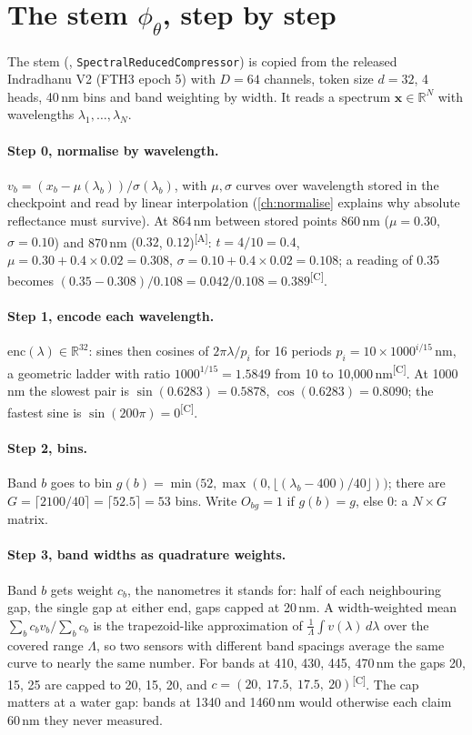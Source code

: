 \documentclass[11pt,a4paper,oneside,openany]{book}
\newcommand{\B}[1]{{\symbf{#1}}}
\newcommand{\B}[1]{{\bm{#1}}}
\newcommand{\comp}{\textsuperscript{\textsf{\scriptsize[C]}}}
\newcommand{\assm}{\textsuperscript{\textsf{\scriptsize[A]}}}
\newcommand{\R}{\mathbb{R}}
\newcommand{\vx}{\B{x}}
\begin{document}
\section{The stem \texorpdfstring{$\phi_\theta$}{phi}, step by step}
\label{sec:asbuilt:stem}

The stem (, \texttt{SpectralReducedCompressor}) is copied from the released Indradhanu V2 (FTH3 epoch 5) with
$D=64$ channels, token size $d=32$, 4 heads, 40\,nm bins and band weighting by width. It reads a spectrum $\vx\in\R^N$ with wavelengths $\lambda_1,\dots,\lambda_N$.

\paragraph{Step 0, normalise by wavelength.} $v_b=(x_b-\mu(\lambda_b))/\sigma(\lambda_b)$, with $\mu,\sigma$ curves over wavelength stored in the checkpoint and read
by linear interpolation (\cref{ch:normalise} explains why absolute reflectance must survive). At 864\,nm between stored points 860\,nm ($\mu=0.30$, $\sigma=0.10$) and
870\,nm ($0.32$, $0.12$)\assm: $t=4/10=0.4$, $\mu=0.30+0.4\times0.02=0.308$, $\sigma=0.10+0.4\times0.02=0.108$; a reading of 0.35 becomes
$(0.35-0.308)/0.108=0.042/0.108=0.389$\comp.

\paragraph{Step 1, encode each wavelength.} $\mathrm{enc}(\lambda)\in\R^{32}$: sines then cosines of $2\pi\lambda/p_i$ for 16 periods $p_i=10\times1000^{i/15}$\,nm, a
geometric ladder with ratio $1000^{1/15}=1.5849$ from 10 to 10,000\,nm\comp. At 1000\,nm the slowest pair is $\sin(0.6283)=0.5878$, $\cos(0.6283)=0.8090$; the fastest sine is
$\sin(200\pi)=0$\comp.

\paragraph{Step 2, bins.} Band $b$ goes to bin $g(b)=\min\big(52,\max(0,\lfloor(\lambda_b-400)/40\rfloor)\big)$; there are $G=\lceil2100/40\rceil=\lceil52.5\rceil=53$ bins.
Write $O_{bg}=1$ if $g(b)=g$, else 0: a $N\times G$ matrix.

\paragraph{Step 3, band widths as quadrature weights.} Band $b$ gets weight $c_b$, the nanometres it stands for: half of each neighbouring gap, the single gap at either end,
gaps capped at 20\,nm. A width-weighted mean $\sum_bc_bv_b/\sum_bc_b$ is the trapezoid-like approximation of $\frac{1}{\Lambda}\int v(\lambda)\,d\lambda$ over the covered
range $\Lambda$, so two sensors with different band spacings average the same curve to nearly the same number. For bands at 410, 430, 445, 470\,nm the gaps 20, 15, 25 are
capped to 20, 15, 20, and $c=(20,\ 17.5,\ 17.5,\ 20)$\comp. The cap matters at a water gap: bands at 1340 and 1460\,nm would otherwise each claim 60\,nm they never measured.
\end{document}

